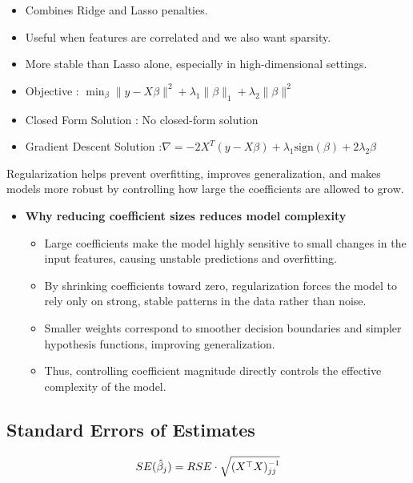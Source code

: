 \documentclass[10pt,a4paper]{article}
\begin{document}
\begin{itemize}
		\begin{itemize}
			\item Combines Ridge and Lasso penalties.
			\item Useful when features are correlated and we also want sparsity.
			\item More stable than Lasso alone, especially in high-dimensional settings.
			\item Objective : $\min_\beta \|y - X\beta\|^2 + \lambda_1 \|\beta\|_1 + \lambda_2 \|\beta\|^2$
			\item Closed Form Solution : No closed-form solution
			\item Gradient Descent Solution :$\nabla = -2X^T (y - X\beta) + \lambda_1 \text{sign}(\beta) + 2\lambda_2 \beta$
		\end{itemize}

	\end{itemize}

	Regularization helps prevent overfitting, improves generalization, and makes models more robust by controlling how large the coefficients are allowed to grow.
	\newline
	\begin{itemize}
		\item \textbf{Why reducing coefficient sizes reduces model complexity}
		\begin{itemize}
			\item Large coefficients make the model highly sensitive to small changes in the input features, causing unstable predictions and overfitting.
			\item By shrinking coefficients toward zero, regularization forces the model to rely only on strong, stable patterns in the data rather than noise.
			\item Smaller weights correspond to smoother decision boundaries and simpler hypothesis functions, improving generalization.
			\item Thus, controlling coefficient magnitude directly controls the effective complexity of the model.
		\end{itemize}
	\end{itemize}

	\subsection{Standard Errors of Estimates}
	$$		\Large SE(\hat{\beta}_j) = RSE \cdot \sqrt{(X^\top X)^{-1} _{jj} }
	$$
\end{document}
